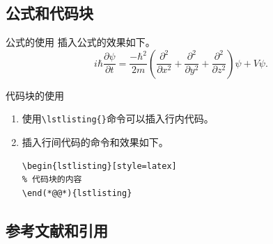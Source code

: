 \documentclass[8pt]{ctexbeamer}
\begin{document}
\subsection{公式和代码块}

\begin{frame}[fragile]{\insertsection}{\insertsubsection}
    \label{frame:eq_and_code}

    \begin{block}{公式的使用}
        插入公式的效果如下。
        \begin{equation}
            \label{eq:example}
            i\hbar\frac{\partial \psi}{\partial t}
= \frac{-\hbar^2}{2m} \left(
\frac{\partial^2}{\partial x^2}
+ \frac{\partial^2}{\partial y^2}
+ \frac{\partial^2}{\partial z^2}
\right) \psi + V \psi.
        \end{equation}
    \end{block}

    \begin{block}{代码块的使用}
        \begin{enumerate}
            \item 使用\lstinline|\lstlisting{}|命令可以插入行内代码。
            \item 插入行间代码的命令和效果如下。
            \begin{lstlisting}[style=latex]
\begin{lstlisting}[style=latex]
% 代码块的内容
\end(*@@*){lstlisting}
            \end{lstlisting}
        \end{enumerate}
    \end{block}
\end{frame}

\subsection{参考文献和引用}
\end{document}
